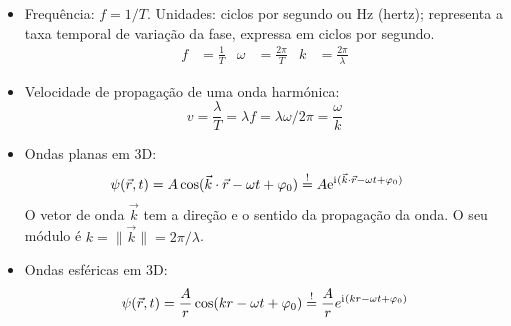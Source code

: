 \begin{itemize}
  \item Frequência: $f=1/T$. Unidades: ciclos por segundo ou Hz (hertz);
    representa a taxa temporal de variação da fase, expressa em ciclos por
    segundo.
    \begin{align*}
      f&=\frac{1}{T}&\omega&=\frac{2\pi}{T}&k&=\frac{2\pi}{\lambda}
    \end{align*}
\item Velocidade de propagação de uma onda harmónica:
\begin{equation*}
v=\frac{\lambda}{T}=\lambda f=\lambda \omega/2\pi=\frac\omega k
\end{equation*}
\item Ondas planas em 3D:
  \begin{align*}
    \psi(\vec r,t)&=A\cos(\vec k\cdot \vec r-\omega t+\varphi_0)\stackrel{!}{=}
                  A\e^{\iu(\vec k\cdot \vec r-\omega t+\varphi_0)}
  \end{align*}
  O vetor de onda $\vec k$ tem a direção e o sentido da propagação da onda. O
  seu módulo é $k=\|\vec k\|=2\pi/\lambda$.
\item
    Ondas esféricas em 3D:
    \begin{equation*}
    \psi(\vec r,t)=\frac{A}{r}\cos(kr-\omega t+\varphi_0)\stackrel{!}{=}
    \frac{A}{r}e^{\iu(kr-\omega t+\varphi_0)}
    \end{equation*}

\end{itemize}

